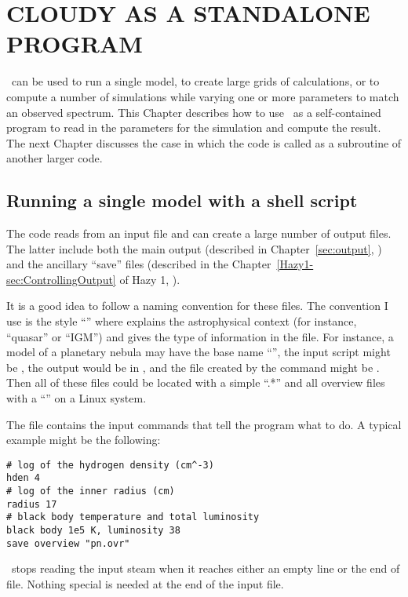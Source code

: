 \chapter{CLOUDY AS A STANDALONE PROGRAM}

\Cloudy\ can be used to run a single model, to create large grids of
calculations, or to compute a number of simulations while
varying one or more parameters to match an observed spectrum.
This Chapter describes how to use \Cloudy\ as a self-contained
program to read in the parameters for
the simulation and compute the result.
The next Chapter discusses the case in which the code is called
as a subroutine of another larger code.

\section{Running a single model with a shell script}

The code reads from an input file and can create a large number of
output files.  The latter include both the main output (described in
Chapter~\ref{sec:output}, ) and
the ancillary ``save'' files (described in the
Chapter~\ref{Hazy1-sec:ControllingOutput} of Hazy 1,
).

It is a good idea to follow a naming convention for these files.
The
convention I use is the style ``''
where  explains
the astrophysical context (for instance, ``quasar'' or ``IGM'')
and 
gives the type of information in the file.
For instance, a model of a
planetary nebula may have the base name ``'',
the input script might be
, the output would be in
, and the file created
by the  command might be
.
Then all of these files
could be located with a simple ``.*''
and all overview files with a
``'' on a Linux system.

The  file contains the input commands
that tell the program what
to do.
A typical example might be the following:
\begin{verbatim}
# log of the hydrogen density (cm^-3)
hden 4
# log of the inner radius (cm)
radius 17
# black body temperature and total luminosity
black body 1e5 K, luminosity 38
save overview "pn.ovr"
\end{verbatim}
\Cloudy\ stops reading the input steam when it reaches
either an empty line or the end of file.
Nothing special is needed at the end of the input file.

